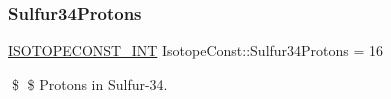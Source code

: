 \subsubsection{\texorpdfstring{Sulfur34\+Protons}{Sulfur34Protons}}
{\footnotesize\ttfamily \mbox{\hyperlink{group___isotope_const-_macros_ga5f18360b3e99483a35c32d789e62621c}{I\+S\+O\+T\+O\+P\+E\+C\+O\+N\+S\+T\+\_\+\+I\+NT}} Isotope\+Const\+::\+Sulfur34\+Protons = 16}

\$ \$ Protons in Sulfur-\/34. 